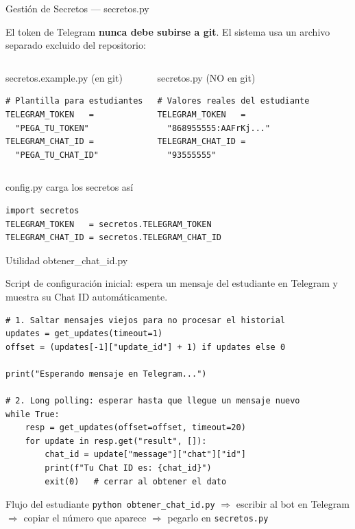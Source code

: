 \documentclass[aspectratio=169]{beamer}
\begin{document}
\begin{frame}[fragile]{Gesti\'on de Secretos --- secretos.py}

El token de Telegram \textbf{nunca debe subirse a git}. El sistema usa un archivo
separado excluido del repositorio:

\vspace{0.3em}
\begin{columns}
\begin{exampleblock}{secretos.example.py \quad (en git)}
\begin{lstlisting}
# Plantilla para estudiantes
TELEGRAM_TOKEN   =
  "PEGA_TU_TOKEN"
TELEGRAM_CHAT_ID =
  "PEGA_TU_CHAT_ID"
\end{lstlisting}
\end{exampleblock}

\begin{alertblock}{secretos.py \quad (NO en git)}
\begin{lstlisting}
# Valores reales del estudiante
TELEGRAM_TOKEN   =
  "868955555:AAFrKj..."
TELEGRAM_CHAT_ID =
  "93555555"
\end{lstlisting}
\end{alertblock}
\end{columns}

\vspace{0.5em}
\begin{block}{config.py carga los secretos as\'i}
\begin{lstlisting}
import secretos
TELEGRAM_TOKEN   = secretos.TELEGRAM_TOKEN
TELEGRAM_CHAT_ID = secretos.TELEGRAM_CHAT_ID
\end{lstlisting}
\end{block}
\end{frame}

\begin{frame}[fragile]{Utilidad obtener\_chat\_id.py}

Script de configuraci\'on inicial: espera un mensaje del estudiante en Telegram
y muestra su Chat ID autom\'aticamente.

\vspace{0.3em}
\begin{lstlisting}
# 1. Saltar mensajes viejos para no procesar el historial
updates = get_updates(timeout=1)
offset = (updates[-1]["update_id"] + 1) if updates else 0

print("Esperando mensaje en Telegram...")

# 2. Long polling: esperar hasta que llegue un mensaje nuevo
while True:
    resp = get_updates(offset=offset, timeout=20)
    for update in resp.get("result", []):
        chat_id = update["message"]["chat"]["id"]
        print(f"Tu Chat ID es: {chat_id}")
        exit(0)   # cerrar al obtener el dato
\end{lstlisting}

\begin{block}{Flujo del estudiante}
\texttt{python obtener\_chat\_id.py}
$\Rightarrow$ escribir al bot en Telegram
$\Rightarrow$ copiar el n\'umero que aparece
$\Rightarrow$ pegarlo en \texttt{secretos.py}
\end{block}
\end{frame}
\end{document}
